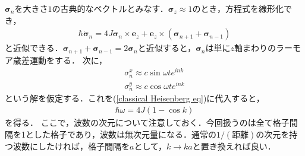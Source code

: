 \documentclass[dvipdfmx,9pt]{beamer}
\numberwithin{equation}{section}
\begin{document}
\begin{frame}{}
    $\bm{\sigma}_n$を大きさ$1$の古典的なベクトルとみなす．$\bm{\sigma}_z \approx 1$のとき，方程式を線形化でき，
    \begin{align}
        \hbar \dot{\bm{\sigma}}_n = 4J \bm{\sigma}_n \times \bm{e}_z + \bm{e}_z \times (\bm{\sigma}_{n+1} + \bm{\sigma}_{n-1})
        \label{classical Heisenberg eq}
    \end{align}
    と近似できる．$\bm{\sigma}_{n+1}+\bm{\sigma}_{n-1}= 2\bm{\sigma}_n$と近似すると，$\bm{\sigma}_n$は単に$z$軸まわりのラーモア歳差運動をする．
    次に，
    \begin{align}
        \sigma_n^x \approx c\sin\omega t e^{ink}
        \\
        \sigma_n^y \approx c\cos\omega t e^{ink}
    \end{align}
    という解を仮定する．これを(\ref{classical Heisenberg eq})に代入すると，
    \begin{align}
        \hbar\omega = 4J(1- \cos k)
    \end{align}
    を得る．
    ここで，波数の次元について注意しておく．今回扱うのは全て格子間隔を1とした格子であり，波数は無次元量になる．通常の$1/(\text{距離})$の次元を持つ波数にしたければ，格子間隔を$a$として，$k \to ka$と置き換えれば良い．
\end{frame}

\end{document}
